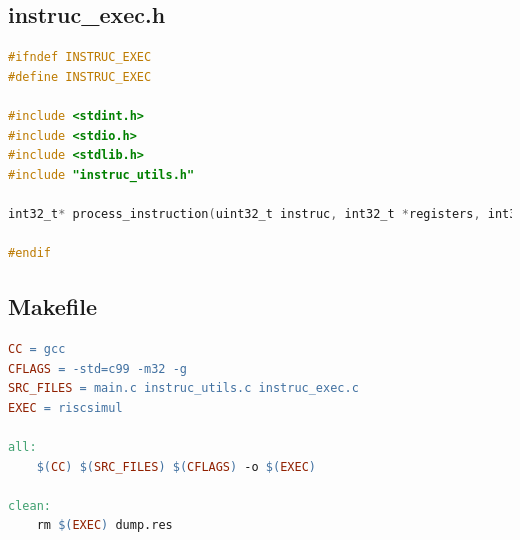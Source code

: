 \subsection{instruc\_exec.h}
\begin{lstlisting}[language=C]
#ifndef INSTRUC_EXEC
#define INSTRUC_EXEC

#include <stdint.h>
#include <stdio.h>
#include <stdlib.h>
#include "instruc_utils.h"

int32_t* process_instruction(uint32_t instruc, int32_t *registers, int32_t *ram, int32_t *pc);

#endif

\end{lstlisting}
\subsection{Makefile}
\begin{lstlisting}[language=make]
CC = gcc
CFLAGS = -std=c99 -m32 -g
SRC_FILES = main.c instruc_utils.c instruc_exec.c
EXEC = riscsimul

all:
	$(CC) $(SRC_FILES) $(CFLAGS) -o $(EXEC)

clean:
	rm $(EXEC) dump.res

\end{lstlisting}







